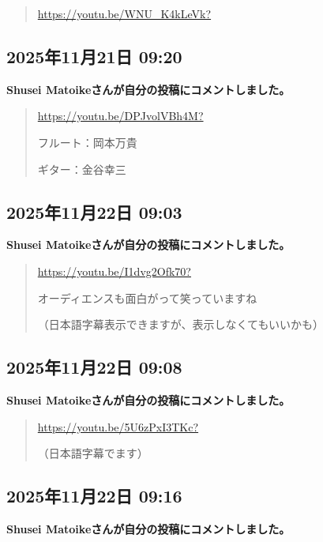 \begin{quote}
\url{https://youtu.be/WNU_K4kLeVk?}
\end{quote}

\subsection*{2025年11月21日 09:20}

\textbf{Shusei Matoikeさんが自分の投稿にコメントしました。}

\begin{quote}
\url{https://youtu.be/DPJvolVBh4M?}

フルート：岡本万貴

ギター：金谷幸三
\end{quote}

\subsection*{2025年11月22日 09:03}

\textbf{Shusei Matoikeさんが自分の投稿にコメントしました。}

\begin{quote}
\url{https://youtu.be/I1dvg2Ofk70?}

オーディエンスも面白がって笑っていますね

（日本語字幕表示できますが、表示しなくてもいいかも）
\end{quote}

\subsection*{2025年11月22日 09:08}

\textbf{Shusei Matoikeさんが自分の投稿にコメントしました。}

\begin{quote}
\url{https://youtu.be/5U6zPxI3TKc?}

（日本語字幕でます）
\end{quote}

\subsection*{2025年11月22日 09:16}

\textbf{Shusei Matoikeさんが自分の投稿にコメントしました。}

